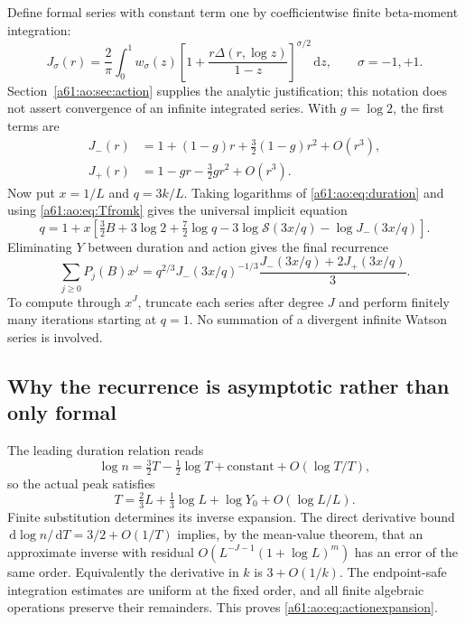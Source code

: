 \documentclass[11pt,letterpaper]{article}
\numberwithin{equation}{section}
\theoremstyle{remark}\newtheorem{remark}[theorem]{Remark}
\newcommand{\Srow}{\mathcal S}
\newcommand{\dd}{\,\mathrm d}
\begin{document}
Define formal series with constant term one by coefficientwise
finite beta-moment integration:
\begin{equation}\label{a61:ao:eq:Jrecurrence}
 J_\sigma(r)=\frac2\pi\int_0^1w_\sigma(z)
 \left[1+\frac{r\Delta(r,\log z)}{1-z}\right]^{\sigma/2}\dd z,
 \qquad \sigma=-1,+1.
\end{equation}
Section~\ref{a61:ao:sec:action} supplies the analytic justification; this
notation does not assert convergence of an infinite integrated
series. With $g=\log2$, the first terms are
\begin{align*}
 J_-(r)&=1+(1-g)r+\tfrac32(1-g)r^2+O(r^3),\\
 J_+(r)&=1-gr-\tfrac32gr^2+O(r^3).
\end{align*}
Now put $x=1/L$ and $q=3k/L$. Taking logarithms of
\eqref{a61:ao:eq:duration} and using \eqref{a61:ao:eq:Tfromk} gives the universal
implicit equation
\begin{equation}\label{a61:ao:eq:qrecurrence}
 q=1+x\left[\tfrac32B+3\log2+\tfrac72\log q
 -3\log\Srow(3x/q)-\log J_-(3x/q)\right].
\end{equation}
Eliminating $Y$ between duration and action gives the final recurrence
\begin{equation}\label{a61:ao:eq:Precurrence}
 \sum_{j\ge0}P_j(B)x^j
 =q^{2/3}J_-(3x/q)^{-1/3}
 \frac{J_-(3x/q)+2J_+(3x/q)}3.
\end{equation}
To compute through $x^J$, truncate each series after degree $J$ and
perform finitely many iterations starting at $q=1$. No summation of
a divergent infinite Watson series is involved.

\subsection{Why the recurrence is asymptotic rather than only formal}
The leading duration relation reads
\[
 \log n=\tfrac32T-\tfrac12\log T+\text{constant}
 +O(\log T/T),
\]
so the actual peak satisfies
\[
 T=\tfrac23L+\tfrac13\log L+\log Y_0+O(\log L/L).
\]
Finite substitution determines its inverse expansion. The direct
derivative bound $\dd\log n/\dd T=3/2+O(1/T)$ implies, by the
mean-value theorem, that an approximate inverse with residual
$O(L^{-J-1}(1+\log L)^m)$ has an error of the same order. Equivalently
the derivative in $k$ is $3+O(1/k)$. The endpoint-safe integration
estimates are uniform at the fixed order, and all finite algebraic
operations preserve their remainders. This proves
\eqref{a61:ao:eq:actionexpansion}.
\end{document}
